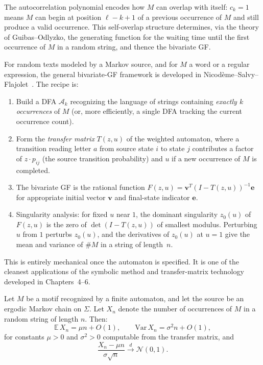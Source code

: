 The autocorrelation polynomial encodes how $M$ can overlap with itself: $c_k = 1$ means $M$ can begin at position $\ell - k + 1$ of a previous occurrence of $M$ and still produce a valid occurrence. This self-overlap structure determines, via the theory of Guibas--Odlyzko, the generating function for the waiting time until the first occurrence of $M$ in a random string, and thence the bivariate GF.

For random texts modeled by a Markov source, and for $M$ a word or a regular expression, the general bivariate-GF framework is developed in Nicodème--Salvy--Flajolet~\cite{NicodemeSalvyFlajolet2002}. The recipe is:

\begin{enumerate}
  \item Build a DFA $\mathcal{A}_{k}$ recognizing the language of strings containing \emph{exactly $k$ occurrences} of $M$ (or, more efficiently, a single DFA tracking the current occurrence count).
  \item Form the \emph{transfer matrix} $T(z, u)$ of the weighted automaton, where a transition reading letter $a$ from source state $i$ to state $j$ contributes a factor of $z \cdot p_{ij}$ (the source transition probability) and $u$ if a new occurrence of $M$ is completed.
  \item The bivariate GF is the rational function $F(z, u) = \mathbf{v}^T (I - T(z,u))^{-1} \mathbf{e}$ for appropriate initial vector $\mathbf{v}$ and final-state indicator $\mathbf{e}$.
  \item Singularity analysis: for fixed $u$ near $1$, the dominant singularity $z_0(u)$ of $F(z, u)$ is the zero of $\det(I - T(z,u))$ of smallest modulus. Perturbing $u$ from $1$ perturbs $z_0(u)$, and the derivatives of $z_0(u)$ at $u = 1$ give the mean and variance of $\#M$ in a string of length~$n$.
\end{enumerate}

This is entirely mechanical once the automaton is specified. It is one of the cleanest applications of the symbolic method and transfer-matrix technology developed in Chapters~4--6.

\begin{proposition}
\label{ch17:prop-gaussian}
Let $M$ be a motif recognized by a finite automaton, and let the source be an ergodic Markov chain on $\Sigma$. Let $X_n$ denote the number of occurrences of $M$ in a random string of length $n$. Then:
\[
  \mathbb{E}\, X_n = \mu n + O(1), \qquad \mathrm{Var}\, X_n = \sigma^2 n + O(1),
\]
for constants $\mu > 0$ and $\sigma^2 > 0$ computable from the transfer matrix, and
\[
  \frac{X_n - \mu n}{\sigma \sqrt{n}} \xrightarrow{d} \mathcal{N}(0, 1).
\]
\end{proposition}

